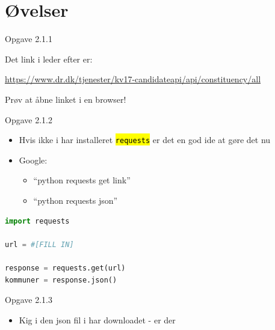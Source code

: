 \documentclass[10pt, hyperref = {colorlinks=true, linkcolor=green}]{beamer}
\let\OldTexttt\texttt
\renewcommand{\texttt}[1]{\OldTexttt{\hl{#1}}}%
\begin{document}
\section{Øvelser}
\begin{frame}[fragile]{Opgave 2.1.1}

\pause
Det link i leder efter er:
\begin{centering}
\href{'https://www.dr.dk/tjenester/kv17-candidateapi/api/constituency/all'}{https://www.dr.dk/tjenester/kv17-candidateapi/api/constituency/all}
\end{centering}
Prøv at åbne linket i en browser!

\end{frame}

\begin{frame}[fragile]{Opgave 2.1.2}

\begin{itemize}
  \item Hvis ikke i har installeret \texttt{requests} er det en god ide at gøre det nu
  \item Google:
  \begin{itemize}
    \item ``python requests get link''
    \item ``python requests json''
  \end{itemize}
\end{itemize}

\pause
\begin{lstlisting}[language=python]
import requests

url = #[FILL IN]

response = requests.get(url)
kommuner = response.json()
\end{lstlisting}
\end{frame}

\begin{frame}[fragile]{Opgave 2.1.3}
  \begin{itemize}
    \item Kig i den json fil i har downloadet - er der
  \end{itemize}
\end{frame}
\end{document}
